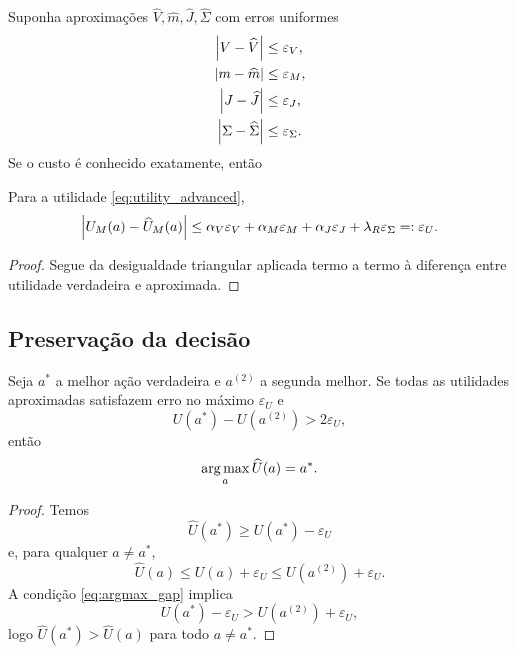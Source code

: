 Suponha aproximações \(\widehat V,\widehat m,\widehat J,\widehat\Sigma\) com erros uniformes
\begin{align}
\left\lvert V-\widehat V \right\rvert&\le\varepsilon_V,\\
\left\lvert m-\widehat m \right\rvert&\le\varepsilon_M,\\
\left\lvert J-\widehat J \right\rvert&\le\varepsilon_J,\\
\left\lvert \Sigma-\widehat\Sigma \right\rvert&\le\varepsilon_\Sigma.
\end{align}
Se o custo é conhecido exatamente, então
\begin{proposition}
Para a utilidade \eqref{eq:utility_advanced},
\begin{equation}
\left\lvert U_M(a)-\widehat U_M(a) \right\rvert
\le
\alpha_V\varepsilon_V+
\alpha_M\varepsilon_M+
\alpha_J\varepsilon_J+
\lambda_R\varepsilon_\Sigma
=: \varepsilon_U.
\label{eq:utility_error_bound}
\end{equation}
\end{proposition}
\begin{proof}
Segue da desigualdade triangular aplicada termo a termo à diferença entre utilidade verdadeira e aproximada.
\end{proof}

\subsection{Preservação da decisão}

\begin{theorem}
Seja \(a^*\) a melhor ação verdadeira e \(a^{(2)}\) a segunda melhor. Se todas as utilidades aproximadas satisfazem erro no máximo \(\varepsilon_U\) e
\begin{equation}
U(a^*)-U(a^{(2)})>2\varepsilon_U,
\label{eq:argmax_gap}
\end{equation}
então
\begin{equation}
\operatorname*{arg\,max}_a\widehat U(a)=a^*.
\end{equation}
\end{theorem}
\begin{proof}
Temos
\[
\widehat U(a^*)\ge U(a^*)-\varepsilon_U
\]
e, para qualquer \(a\neq a^*\),
\[
\widehat U(a)\le U(a)+\varepsilon_U
\le U(a^{(2)})+\varepsilon_U.
\]
A condição \eqref{eq:argmax_gap} implica
\[
U(a^*)-\varepsilon_U>U(a^{(2)})+\varepsilon_U,
\]
logo \(\widehat U(a^*)>\widehat U(a)\) para todo \(a\neq a^*\).
\end{proof}

